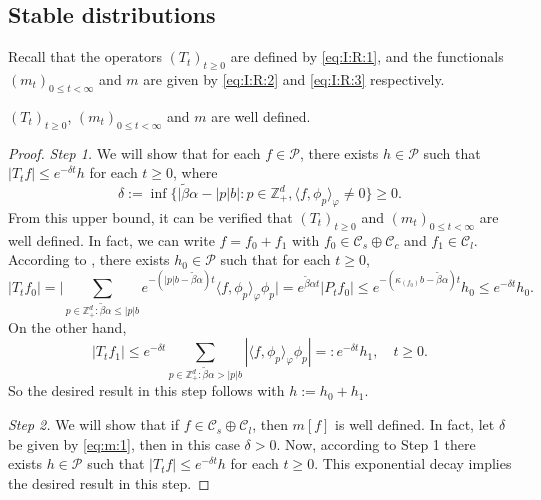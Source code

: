 \documentclass[EJP]{ejpecp} %
\begin{document}
\subsection{Stable distributions}
\label{sec: stable distributions}
	Recall that the operators $(T_t)_{t\geq 0}$ are defined by \eqref{eq:I:R:1}, and the functionals $(m_{t})_{0\leq t< \infty}$ and $m$ are given by \eqref{eq:I:R:2} and \eqref{eq:I:R:3} respectively.
\begin{lemma}
\label{lem:m}
	$(T_t)_{t\geq 0}$,  $(m_{t})_{0\leq t< \infty}$ and  $m$ are well defined.
\end{lemma}
\begin{proof}
  	\emph{Step 1.} We will show that for each $f \in \mathcal P$, there exists $h \in \mathcal P$ such that $ |T_tf| \leq  e^{- \delta t} h$ for each $t\geq 0$, where
\begin{equation}
\label{eq:m:1}
    \delta
    := \inf \big\{ \big|\tilde \beta \alpha - |p|b\big| : p \in \mathbb Z_+^d, \langle f, \phi_p\rangle_\varphi \neq 0 \big\}
    \geq 0.
\end{equation}
	From this upper bound, it can be verified that $(T_t)_{t\geq 0}$ and $(m_{t})_{0 \leq t < \infty}$ are well defined.
	In fact, we can write $f = f_0 + f_1$ with $f_0\in \mathcal C_s \oplus \mathcal C_c$ and $f_1 \in \mathcal C_l$.
	According to \cite[Lemma 2.7]{MarksMilos2018CLT}, there exists $h_0 \in \mathcal P$ such that for each $t\geq 0$,
\[
    |T_t f_0|
    = \Big| \sum_{p \in  \mathbb Z_+^d: \tilde \beta \alpha \leq |p|b } e^{- ( |p| b - \tilde \beta \alpha ) t} \langle f, \phi_p \rangle_\varphi \phi_p \Big|
    = e^{\tilde \beta \alpha t} | P_t f_0 |
    \leq e^{- ( \kappa_{(f_0)} b - \tilde \beta \alpha) t} h_0
    \leq e^{- \delta t} h_0.
\]
	On the other hand,
\[
    |T_t f_1|
    \leq e^{- \delta t}\sum_{p \in \mathbb Z_+^d : \tilde \beta \alpha > |p|b} |\langle f, \phi_p \rangle_\varphi \phi_p|
    =: e^{- \delta t} h_1,
    \quad t\geq 0.
\]
  	So the desired result in this step follows with $h := h_0 + h_1$.

	\emph{Step 2.} We will show that if $f \in \mathcal C_s \oplus \mathcal C_l$, then $m[f]$ is well defined.
  	In fact, let $\delta$ be given by \eqref{eq:m:1}, then in this case $\delta > 0$.
  	Now, according to Step 1 there exists $h \in \mathcal P$ such that $|T_tf| \leq e^{- \delta t} h$ for each $t\geq 0$.
  	This exponential decay implies the desired result in this step.


\end{proof}
\end{document}
